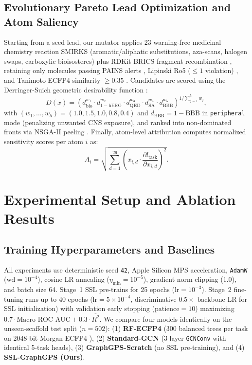 \documentclass[conference]{IEEEtran}
\begin{document}
\subsection{Evolutionary Pareto Lead Optimization and Atom Saliency}
Starting from a seed lead, our mutator applies 23 warning-free medicinal chemistry reaction SMIRKS (aromatic/aliphatic substitutions, aza-scans, halogen swaps, carboxylic bioisosteres) plus RDKit BRICS fragment recombination \cite{Degen2008BRICS}, retaining only molecules passing PAINS alerts \cite{Baell2010PAINS}, Lipinski Ro5 ($\le 1$ violation) \cite{Lipinski2001Ro5}, and Tanimoto ECFP4 similarity $\ge 0.35$ \cite{Rogers2010ECFP}. Candidates are scored using the Derringer-Suich geometric desirability function \cite{Derringer1980Desirability}:
\begin{equation}
D(x) = \left( d_{\text{bio}}^{w_1} \cdot d_{1-\text{hERG}}^{w_2} \cdot d_{\text{QED}}^{w_3} \cdot d_{\text{SA}}^{w_4} \cdot d_{\text{BBB}}^{w_5} \right)^{1/\sum_{j=1}^5 w_j},
\end{equation}
with $(w_1,\dots,w_5) = (1.0, 1.5, 1.0, 0.8, 0.4)$ and $d_{\text{BBB}} = 1 - \text{BBB}$ in \texttt{peripheral} mode (penalizing unwanted CNS exposure), and ranked into non-dominated fronts via NSGA-II peeling \cite{Deb2002NSGA2}. Finally, atom-level attribution \cite{Shrikumar2017InputGrad} computes normalized sensitivity scores per atom $i$ as:
\begin{equation}
A_i = \sqrt{\sum_{d=1}^{29} \left(x_{i,d} \cdot \frac{\partial l_{\text{task}}}{\partial x_{i,d}}\right)^2}.
\end{equation}

\section{Experimental Setup and Ablation Results}
\subsection{Training Hyperparameters and Baselines}
All experiments use deterministic seed \texttt{42}, Apple Silicon MPS acceleration, \texttt{AdamW} ($\text{wd}=10^{-4}$), cosine LR annealing ($\eta_{\min}=10^{-5}$), gradient norm clipping ($1.0$), and batch size 64. Stage~1 SSL pre-trains for 25 epochs ($\text{lr}=10^{-3}$). Stage~2 fine-tuning runs up to 40 epochs ($\text{lr}=5\times 10^{-4}$, discriminative $0.5\times$ backbone LR for SSL initialization) with validation early stopping ($\text{patience}=10$) maximizing $0.7\cdot\text{Macro-ROC-AUC} + 0.3\cdot\overline{R^2}$. We compare four models identically on the unseen-scaffold test split ($n=502$): (1) \textbf{RF-ECFP4} (300 balanced trees per task on 2048-bit Morgan ECFP4 \cite{Rogers2010ECFP,Breiman2001RF}), (2) \textbf{Standard-GCN} (3-layer \texttt{GCNConv} \cite{Kipf2017GCN} with identical 5-task heads), (3) \textbf{GraphGPS-Scratch} (no SSL pre-training), and (4) \textbf{SSL-GraphGPS (Ours)}.
\end{document}
